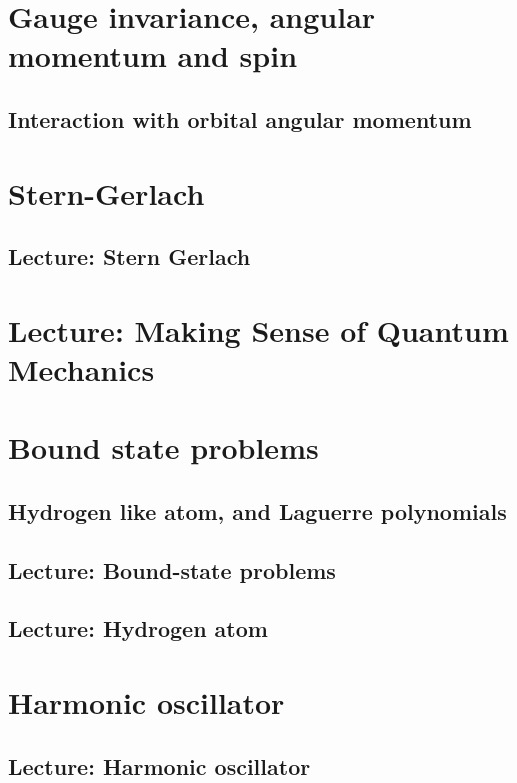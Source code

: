    \chapter{Gauge invariance, angular momentum and spin}
      \section{Interaction with orbital angular momentum}
         

   \chapter{Stern-Gerlach}
      \section{Lecture: Stern Gerlach}
         

   \chapter{Lecture: Making Sense of Quantum Mechanics}
      

   \chapter{Bound state problems}
      \section{Hydrogen like atom, and Laguerre polynomials}
         
      \section{Lecture: Bound-state problems}
         
      \section{Lecture: Hydrogen atom}
         

   \chapter{Harmonic oscillator}
      \section{Lecture: Harmonic oscillator}
         

